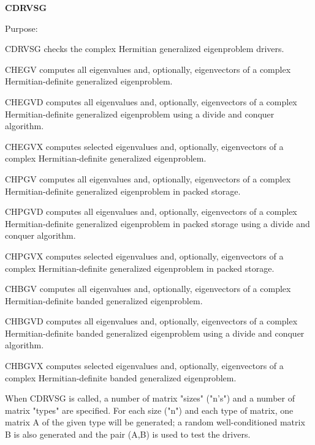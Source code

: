 {\bfseries C\+D\+R\+V\+S\+G} 

\begin{DoxyParagraph}{Purpose\+: }
\begin{DoxyVerb}      CDRVSG checks the complex Hermitian generalized eigenproblem
      drivers.

              CHEGV computes all eigenvalues and, optionally,
              eigenvectors of a complex Hermitian-definite generalized
              eigenproblem.

              CHEGVD computes all eigenvalues and, optionally,
              eigenvectors of a complex Hermitian-definite generalized
              eigenproblem using a divide and conquer algorithm.

              CHEGVX computes selected eigenvalues and, optionally,
              eigenvectors of a complex Hermitian-definite generalized
              eigenproblem.

              CHPGV computes all eigenvalues and, optionally,
              eigenvectors of a complex Hermitian-definite generalized
              eigenproblem in packed storage.

              CHPGVD computes all eigenvalues and, optionally,
              eigenvectors of a complex Hermitian-definite generalized
              eigenproblem in packed storage using a divide and
              conquer algorithm.

              CHPGVX computes selected eigenvalues and, optionally,
              eigenvectors of a complex Hermitian-definite generalized
              eigenproblem in packed storage.

              CHBGV computes all eigenvalues and, optionally,
              eigenvectors of a complex Hermitian-definite banded
              generalized eigenproblem.

              CHBGVD computes all eigenvalues and, optionally,
              eigenvectors of a complex Hermitian-definite banded
              generalized eigenproblem using a divide and conquer
              algorithm.

              CHBGVX computes selected eigenvalues and, optionally,
              eigenvectors of a complex Hermitian-definite banded
              generalized eigenproblem.

      When CDRVSG is called, a number of matrix "sizes" ("n's") and a
      number of matrix "types" are specified.  For each size ("n")
      and each type of matrix, one matrix A of the given type will be
      generated; a random well-conditioned matrix B is also generated
      and the pair (A,B) is used to test the drivers.


\end{DoxyVerb}
\end{DoxyParagraph}
